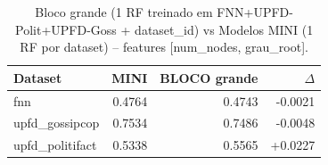 \begin{table}[h]\centering
\caption{Bloco grande (1 RF treinado em FNN+UPFD-Polit+UPFD-Goss + dataset\_id) vs Modelos MINI (1 RF por dataset) -- features [num\_nodes, grau\_root].}
\label{tab:bloco_vs_mini}
\begin{tabular}{lrrr}
\toprule
Dataset & MINI & BLOCO grande & $\Delta$ \\
\midrule
fnn & 0.4764 & 0.4743 & -0.0021 \\
upfd_gossipcop & 0.7534 & 0.7486 & -0.0048 \\
upfd_politifact & 0.5338 & 0.5565 & +0.0227 \\
\bottomrule
\end{tabular}
\end{table}